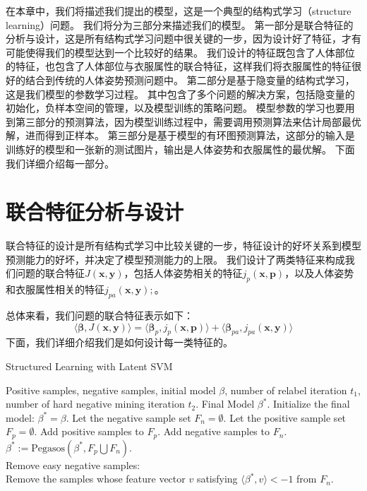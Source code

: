 在本章中，我们将描述我们提出的模型，这是一个典型的结构式学习（structure learning）问题。
我们将分为三部分来描述我们的模型。
第一部分是联合特征的分析与设计，这是所有结构式学习问题中很关键的一步，因为设计好了特征，才有可能使得我们的模型达到一个比较好的结果。
我们设计的特征既包含了人体部位的特征，也包含了人体部位与衣服属性的联合特征，这样我们将衣服属性的特征很好的结合到传统的人体姿势预测问题中。
第二部分是基于隐变量的结构式学习，这是我们模型的参数学习过程。
其中包含了多个问题的解决方案，包括隐变量的初始化，负样本空间的管理，以及模型训练的策略问题。
模型参数的学习也要用到第三部分的预测算法，因为模型训练过程中，需要调用预测算法来估计局部最优解，进而得到正样本。
第三部分是基于模型的有环图预测算法，这部分的输入是训练好的模型和一张新的测试图片，输出是人体姿势和衣服属性的最优解。
下面我们详细介绍每一部分。

\section{联合特征分析与设计}
联合特征的设计是所有结构式学习中比较关键的一步\cite{svm-struct}，特征设计的好坏关系到模型预测能力的好坏，并决定了模型预测能力的上限。
我们设计了两类特征来构成我们问题的联合特征$J(\mathbf{x}, \mathbf{y})$，包括人体姿势相关的特征$j_p(\mathbf{x}, \mathbf{p})$，以及人体姿势和衣服属性相关的特征$j_{pa}(\mathbf{x}, \mathbf{y});$。

总体来看，我们问题的联合特征表示如下：
\begin{equation}
    \label{eq:feature}
    \langle \mathbf{\beta}, J(\mathbf{x},\mathbf{y}) \rangle = \langle \mathbf{\beta}_p, j_p(\mathbf{x}, \mathbf{p}) \rangle + \langle \mathbf{\beta}_{pa}, j_{pa}(\mathbf{x},\mathbf{y}) \rangle
\end{equation}
下面，我们详细介绍我们是如何设计每一类特征的。




\begin{algorithm}
\caption{Structured Learning with Latent SVM}
\begin{algorithmic}[1]
    \REQUIRE Positive samples, negative samples, initial model $\beta$, number of relabel iteration $t_1$, number of hard negative mining iteration $t_2$.
    \ENSURE Final Model ${\beta}^*$.
    \STATE Initialize the final model: ${\beta}^* = \beta$.
    \STATE Let the negative sample set $F_n = \emptyset$.
        \STATE Let the positive sample set $F_p = \emptyset$.
        \STATE Add positive samples to $F_p$.
            \STATE Add negative samples to $F_n$.
            \STATE ${\beta}^* := \mathrm{Pegasos}({\beta}^*, F_p \bigcup F_n)$.\\
            \STATE Remove easy negative samples: \\
             Remove the samples whose feature vector $v$ satisfying $\langle{\beta}^*, v \rangle < -1$ from $F_n$.
        \ENDFOR
    \ENDFOR
\end{algorithmic}
\label{alg:train}
\end{algorithm}


